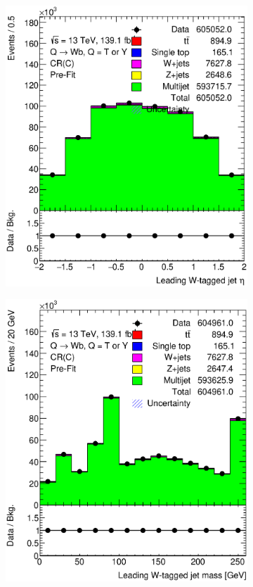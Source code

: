 \begin{figure}[hbt!]
\begin{subfigure}{.35\textwidth}
		\includegraphics[width=\linewidth,height=\textheight,keepaspectratio]{CR_C_ljet_eta.eps}
		\caption{}
		\label{fig:app:cr_c:ljet_eta}
	\end{subfigure}
	\begin{subfigure}{.35\textwidth}
		\centering
		\includegraphics[width=\linewidth,height=\textheight,keepaspectratio]{CR_C_ljet_m.eps}

\end{subfigure}
\end{figure}
